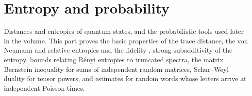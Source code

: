 \part{Entropy and probability}
\label{part:entropy_and_probability}

Distances and entropies of quantum states, and the probabilistic tools used
later in the volume. This part proves the basic properties of the trace
distance, the von Neumann and relative entropies and the fidelity
\cite[Chapter~8]{Wolf2012Quantum}, strong subadditivity of the entropy, bounds
relating R\'enyi entropies to truncated spectra, the matrix Bernstein
inequality for sums of independent random matrices, Schur--Weyl duality for
tensor powers, and estimates for random words whose letters arrive at
independent Poisson times.
